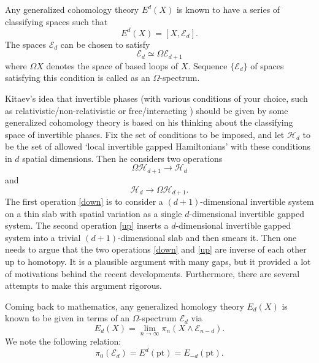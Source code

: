 \documentclass[12pt]{article}
\numberwithin{equation}{section}
\numberwithin{figure}{section}
\theoremstyle{remark}
\def\cE{\mathcal{E}}
\def\cH{\mathcal{H}}
\def\pt{\mathrm{pt}}
\begin{document}
Any generalized cohomology theory $E^d(X)$ is known to have a series of classifying spaces such that \begin{equation}
E^d(X) = [X,\cE_d].
\end{equation} The spaces $\cE_d$ can be chosen to satisfy \begin{equation}
\cE_d \simeq \Omega \cE_{d+1}
\end{equation} where $\Omega X$ denotes the space of based loops of $X$.
Sequence $\{\cE_d\}$ of spaces satisfying this condition is called as an $\Omega$-spectrum.

Kitaev's idea that invertible phases (with various conditions of your choice,
such as relativistic/non-relativistic or free/interacting ) should be given by
some generalized cohomology theory is based on his thinking about the
classifying space of invertible phases.
Fix the set of conditions to be imposed, and let $\cH_d$ 
to be the set of allowed  `local invertible gapped Hamiltonians' with these conditions
in $d$ spatial dimensions.
Then he considers two operations \begin{equation}
\Omega \cH_{d+1} \to \cH_d
\label{down}
\end{equation} and \begin{equation}
\cH_{d} \to \Omega\cH_{d+1}.
\label{up}
\end{equation}
The first operation \eqref{down} is to consider a $(d+1)$-dimensional invertible system
on a thin slab with spatial variation as a single $d$-dimensional invertible gapped system.
The second operation \eqref{up} inserts a $d$-dimensional invertible gapped system 
into a trivial $(d+1)$-dimensional slab and then smears it.
Then one needs to argue that the two operations \eqref{down} and \eqref{up} are 
inverse of each other up to homotopy.
It is a plausible argument with many gaps, but it provided a lot of motivations 
behind the recent developments. 
Furthermore, there are several attempts to make this argument rigorous.


Coming back to mathematics, any generalized homology  theory $E_d(X)$ is known to be given in terms of an $\Omega$-spectrum $\cE_d$ via \begin{equation}
E_d(X) = \lim_{n\to \infty} \pi_{n} ( X\wedge \cE_{n-d}).
\label{homodef}
\end{equation}
We note the following relation: \begin{equation}
\pi_0(\cE_d)= E^d(\pt)=E_{-d}(\pt).
\end{equation}
\end{document}
